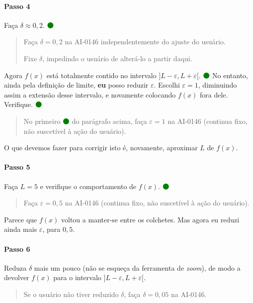 \documentclass[fleqn,12pt]{article}
\newenvironment{ct}{\begin{quotation}\color{red!30!black}\sffamily\small}{\end{quotation}} %
\newcommand\foreign[1]{\textsl{#1}}
\newcommand\proceed{\textcolor{green}{$\medbullet$}\xspace}
\begin{document}
    \paragraph{Passo 4} Faça $\delta \approx 0,2$. \proceed

    \begin{ct}
	Faça $\delta = 0,2$ na AI-0146 independentemente do ajuste do usuário.

	Fixe $\delta$, impedindo o usuário de alterá-lo a partir daqui.
    \end{ct}

    Agora $f(x)$ está totalmente contido no intervalo $]L - \varepsilon, L + \varepsilon[$. \proceed No entanto, ainda pela definição de limite, \textbf{eu} posso reduzir $\varepsilon$. Escolhi $\varepsilon = 1$, diminuindo assim a extensão desse intervalo, e novamente colocando $f(x)$ fora dele. Verifique. \proceed

    \begin{ct}
	No primeiro \proceed do parágrafo acima, faça $\varepsilon = 1$ na AI-0146 (continua fixo, não suscetível à ação do usuário).
    \end{ct}

    O que devemos fazer para corrigir isto é, novamente, aproximar $L$ de $f(x)$.

    \paragraph{Passo 5} Faça $L = 5$ e verifique o comportamento de $f(x)$. \proceed

    \begin{ct}
	Faça $\varepsilon = 0,5$ na AI-0146 (continua fixo, não suscetível à ação do usuário).
    \end{ct}

    Parece que $f(x)$ voltou a manter-se entre os colchetes. Mas agora eu reduzi ainda mais $\varepsilon$, para $0,5$.

    \paragraph{Passo 6} Reduza $\delta$ mais um pouco (não se esqueça da ferramenta de \foreign{zoom}), de modo a devolver $f(x)$ para o intervalo $]L - \varepsilon, L + \varepsilon[$.

    \begin{ct}
	Se o usuário não tiver reduzido $\delta$, faça $\delta = 0,05$ na AI-0146.
    \end{ct}
\end{document}
